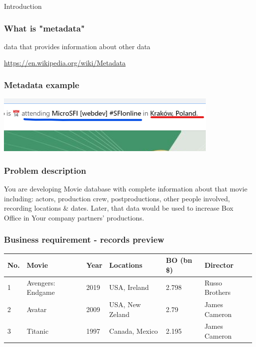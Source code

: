 \documentclass{beamer}
\begin{document}
\begin{section}{Introduction}

\begin{frame}

\frametitle{What is "metadata"}
\begin{displayquote}
data that provides information about other data
\end{displayquote}

\url{https://en.wikipedia.org/wiki/Metadata}

\end{frame}

\begin{frame}
\frametitle{Metadata example}

\centering
 \includegraphics{metadataExample.png}

\end{frame}

\begin{frame}
\frametitle{Problem description}
You are developing Movie database with complete information about that movie including: \pause actors, production crew, postproductions, other people involved, recording locations \& dates. \pause
\newline \newline
Later, that data would be used to increase Box Office in Your company partners' productions.
\end{frame}

\begin{frame}
\frametitle{Business requirement - records preview\footnotemark[1] }
\begin{tabular}{| m{0.5cm} | m{3.25cm} | m{1cm} | m{2.25cm} | m{1cm} | m{1.5cm} |}
\hline
No. &  Movie & Year & Locations & BO (bn \$) & Director \\
\hline \hline
1 & Avengers: Endgame & 2019 & USA,  Ireland & 2.798 & Russo Brothers \\ \hline
2 & Avatar & 2009 & USA,  New Zeland & 2.79 & James Cameron \\  \hline
3 & Titanic & 1997 & Canada, Mexico & 2.195 & James Cameron \\  
\hline
\end{tabular}


\end{frame}
\end{section}
\end{document}
